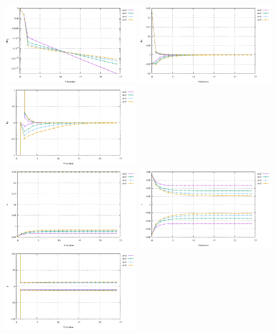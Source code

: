 \begin{center}
\includegraphics[width=5.7cm]{python_codes/fieldstone_87/results/experiment_01/conv}
\includegraphics[width=5.7cm]{python_codes/fieldstone_87/results/experiment_01/du}
\includegraphics[width=5.7cm]{python_codes/fieldstone_87/results/experiment_01/dp}\\
\includegraphics[width=5.7cm]{python_codes/fieldstone_87/results/experiment_01/u}
\includegraphics[width=5.7cm]{python_codes/fieldstone_87/results/experiment_01/v}
\includegraphics[width=5.7cm]{python_codes/fieldstone_87/results/experiment_01/p}
\end{center}

